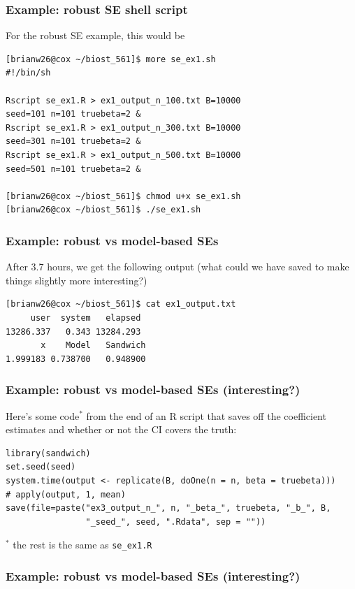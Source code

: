 \documentclass[12pt, 
hyperref={colorlinks=true, linkcolor=blue, urlcolor=cyan}]{beamer}
\begin{document}
\begin{frame}[fragile]
\frametitle{Example: robust SE shell script}
For the robust SE example, this would be 
{\scriptsize
\begin{verbatim}
[brianw26@cox ~/biost_561]$ more se_ex1.sh
#!/bin/sh

Rscript se_ex1.R > ex1_output_n_100.txt B=10000 
seed=101 n=101 truebeta=2 &
Rscript se_ex1.R > ex1_output_n_300.txt B=10000 
seed=301 n=101 truebeta=2 &
Rscript se_ex1.R > ex1_output_n_500.txt B=10000 
seed=501 n=101 truebeta=2 &

[brianw26@cox ~/biost_561]$ chmod u+x se_ex1.sh
[brianw26@cox ~/biost_561]$ ./se_ex1.sh
\end{verbatim}
}
\end{frame}

\begin{frame}[fragile]
\frametitle{Example: robust vs model-based SEs}
After 3.7 hours, we get the following output (what could we have saved to make things slightly more interesting?)

\begin{verbatim}
[brianw26@cox ~/biost_561]$ cat ex1_output.txt
     user  system   elapsed
13286.337   0.343 13284.293
       x    Model   Sandwich
1.999183 0.738700   0.948900
\end{verbatim}
\end{frame}

\begin{frame}[fragile]
\frametitle{Example: robust vs model-based SEs \small (interesting?)}
Here's some code$^*$ from the end of an R script that saves off the coefficient estimates and whether or not the CI covers the truth: 
{\scriptsize
\begin{verbatim}
library(sandwich)
set.seed(seed)
system.time(output <- replicate(B, doOne(n = n, beta = truebeta)))
# apply(output, 1, mean)
save(file=paste("ex3_output_n_", n, "_beta_", truebeta, "_b_", B, 
                "_seed_", seed, ".Rdata", sep = ""))
\end{verbatim}
}
\small
${}^*$ the rest is the same as \texttt{se\_ex1.R} 
\end{frame}

\begin{frame}
\frametitle{Example: robust vs model-based SEs \small (interesting?)}
\end{frame}
\end{document}
